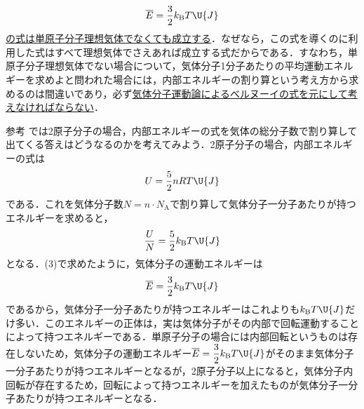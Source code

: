 \begin{multicols}{2}
\begin{chuu}
\[\overline{E}=\frac{3}{2}k_{\mathrm{B}}T\U{J}\]
\underline{の式は}\hskip0pt\underline{単原子}\hskip0pt\underline{分子理}\hskip0pt\underline{想気体}\hskip0pt\underline{でなく}\hskip0pt\underline{ても成}\hskip0pt\underline{立する}．なぜなら，この式を導くのに利用した式はすべて理想気体でさえあれば成立する式だからである．すなわち，単原子分子理想気体でない場合について，気体分子1分子あたりの平均運動エネルギーを求めよと問われた場合には，内部エネルギーの割り算という考え方から求めるのは間違いであり，必ず\underline{気体分}\hskip0pt\underline{子運動}\hskip0pt\underline{論によ}\hskip0pt\underline{るベル}\hskip0pt\underline{ヌーイ}\hskip0pt\underline{の式を}\hskip0pt\underline{元にし}\hskip0pt\underline{て考え}\hskip0pt\underline{なけれ}\hskip0pt\underline{ばなら}\hskip0pt\underline{ない}．
\end{chuu}
\begin{bsHosoku}{参考}
では2原子分子の場合，内部エネルギーの式を気体の総分子数で割り算して出てくる答えはどうなるのかを考えてみよう．2原子分子の場合，内部エネルギーの式は
\[U=\frac{5}{2}nRT\U{J}\]
である．これを気体分子数$N=n\cdot N_{\mathrm{A}}$で割り算して気体分子一分子あたりが持つエネルギーを求めると，
\[\frac{U}{N}=\frac{5}{2}k_{\mathrm{B}}T\U{J}\]
となる．(3)で求めたように，気体分子の運動エネルギーは
\[\overline{E}=\frac{3}{2}k_{\mathrm{B}}T\U{J}\]
であるから，気体分子一分子あたりが持つエネルギーはこれよりも$k_{\mathrm{B}}T\U{J}$だけ多い．このエネルギーの正体は，実は気体分子がその内部で回転運動することによって持つエネルギーである．単原子分子の場合には内部回転というものは存在しないため，気体分子の運動エネルギー$\overline{E}=\dfrac{3}{2}k_{\mathrm{B}}T\U{J}$がそのまま気体分子一分子あたりが持つエネルギーとなるが，2原子分子以上になると，気体分子内回転が存在するため，回転によって持つエネルギーを加えたものが気体分子一分子あたりが持つエネルギーとなる．
\end{bsHosoku}


\end{multicols}
